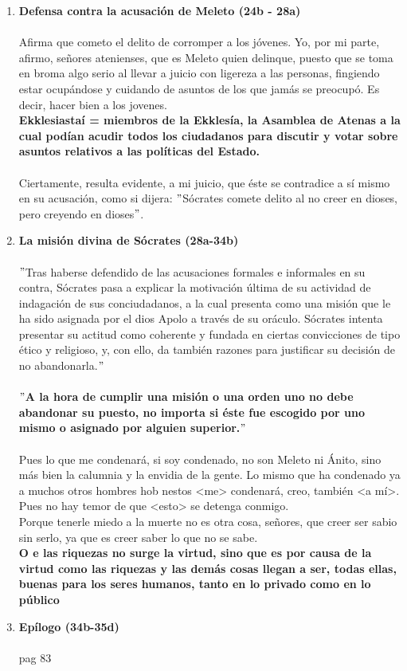 \begin{multicols}{2}
\begin{enumerate}[\bfseries 1.]
	\item \textbf{Defensa contra la acusación de Meleto (24b - 28a)}\\\\
	    Afirma que cometo el delito de corromper a los jóvenes. Yo, por mi parte, afirmo, señores atenienses, que es Meleto quien delinque, puesto que se toma en broma algo serio al llevar a juicio con ligereza a las personas, fingiendo estar ocupándose y cuidando de asuntos de los que jamás se preocupó. Es decir, hacer bien a los jovenes. \\
	    \textbf{Ekklesiastaí = miembros de la Ekklesía, la Asamblea de Atenas a la cual podían acudir todos los ciudadanos para discutir y votar sobre asuntos relativos a las políticas del Estado.}\\\\ 
	    Ciertamente, resulta evidente, a mi juicio, que éste se contradice a sí mismo en su acusación, como si dijera: $"$Sócrates comete delito al no creer en dioses, pero creyendo en dioses$"$.\\

	\item \textbf{La misión divina de Sócrates (28a-34b)}\\\\
	    $"$Tras haberse defendido de las acusaciones formales e informales en su contra, Sócrates pasa a explicar la motivación última de su actividad de indagación de sus conciudadanos, a la cual presenta como una misión que le ha sido asignada por el dios Apolo a través de su oráculo. Sócrates intenta presentar su actitud como coherente y fundada en ciertas convicciones de tipo ético y religioso, y, con ello, da también razones para justificar su decisión de no abandonarla.$"$\\\\

	    \textbf{$"$A la hora de cumplir una misión o una orden uno no debe abandonar su puesto, no importa si éste fue escogido por uno mismo o asignado por alguien superior.$"$}\\\\

	    Pues lo que me condenará, si soy condenado, no son Meleto ni Ánito, sino más bien la calumnia y la envidia de la gente. Lo mismo que ha condenado ya a muchos otros hombres hob nestos <me> condenará, creo, también <a mí>. Pues no hay temor de que <esto> se detenga conmigo.\\
	     Porque tenerle miedo a la muerte no es otra cosa, señores, que creer ser sabio sin serlo, ya que es creer saber lo que no se sabe.\\
	     \textbf{O e las riquezas no surge la virtud, sino que es por causa de la virtud como las riquezas y las demás cosas llegan a ser, todas ellas, buenas para los seres humanos, tanto en lo privado como en lo público}

    \item \textbf{Epílogo (34b-35d)}\\\\
pag 83


    \end{enumerate}

\end{multicols}
